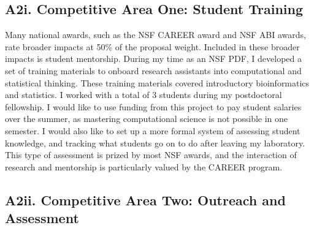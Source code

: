 \documentclass[12pt]{article}
\begin{document}
\subsection*{A2i. Competitive Area One: Student Training}

Many national awards, such as the NSF CAREER award and NSF ABI awards, rate broader impacts at 50\% of the proposal weight.
Included in these broader impacts is student mentorship. 
During my time as an NSF PDF, I developed a set of training materials to onboard research assistants into computational and statistical thinking.
These training materials covered introductory bioinformatics and statistics.
I worked with a total of 3 students during my postdoctoral fellowship.
I would like to use funding from this project to pay student salaries over the summer, as mastering computational science is not possible in one semester.
I would also like to set up a more formal system of assessing student knowledge, and tracking what students go on to do after leaving my laboratory. 
This type of assessment is prized by most NSF awards, and the interaction of research and mentorship is particularly valued by the CAREER program. \par

\subsection*{A2ii. Competitive Area Two: Outreach and Assessment}
\end{document}
